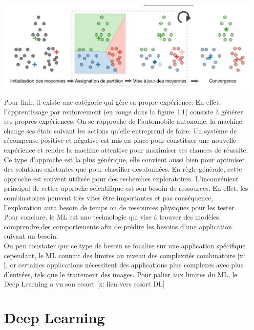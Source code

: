 \documentclass[12pt,a4paper]{report}
\begin{document}
\begin{center}
	\includegraphics[scale=0.4]{k_means}
	\label{fig1}
\end{center}

Pour finir, il existe une catégorie qui gère sa propre expérience. En effet, l'apprentissage par renforcement (en rouge dans la figure 1.1) consiste à générer ses propres expériences. On se rapproche de l'automobile autonome, la machine change ses états suivant les actions qu'elle entreprend de faire. Un système de récompense positive et négative est mis en place pour constituer une nouvelle expérience et rendre la machine attentive pour maximiser ses chances de réussite. Ce type d'approche est la plus générique, elle convient aussi bien pour optimiser des solutions existantes que pour classifier des données. En règle générale, cette approche est souvent utilisée pour des recherches exploratoires. L'inconvénient principal de cettre approche scientifique est son besoin de ressources. En effet, les combinatoires peuvent très vites être importantes et pas conséquence, l'exploration aura besoin de temps ou de ressources physiques pour les tester.\\

Pour conclure, le ML est une technologie qui vise à trouver des modèles, comprendre des comportements afin de prédire les besoins d'une application suivant un besoin.\\

On peu constater que ce type de besoin se focalise sur une application spécifique cependant, le ML connait des limites au niveau des complexités combinatoire [x: ], or certaines applications nécessitent des applications plus complexes avec plus d'entrées, tels que le traitement des images. Pour palier aux limites du ML, le Deep Learning a vu son essort [x: lien vers essort DL]


\chapter{Deep Learning}
\end{document}
